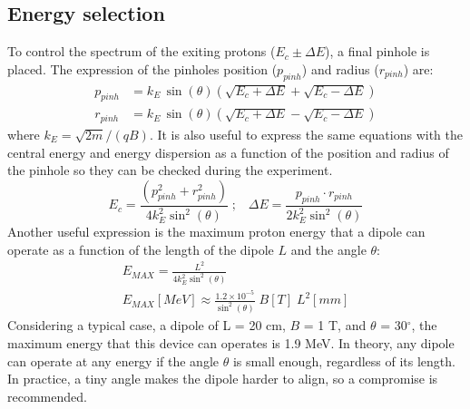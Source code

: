 \documentclass{cup-hpl}
\begin{document}
\subsection{Energy selection}
To control the spectrum of the exiting protons ($E_c \pm \Delta E$), a final pinhole is placed. The expression of the pinholes position ($p_{pinh}$)  and radius ($r_{pinh}$) are:
\begin{align}
p_{pinh} & = k_E \, \sin(\theta) \left(\sqrt{E_c + \Delta E} + \sqrt{E_c - \Delta E}\right) \\
r_{pinh} & = k_E \, \sin(\theta) \left(\sqrt{E_c + \Delta E} - \sqrt{E_c - \Delta E}\right)
\label{Eq: Pinhole coordinates}
\end{align}
where  $k_E = \sqrt{2 m}/(q B)$.
It is also useful to express the same equations with the central energy and energy dispersion as a function of the position and radius of the pinhole so they can be checked during the experiment.
\begin{equation}
E_c  = \frac{(p_{pinh}^2 + r_{pinh}^2)}{4 k_E^2 \sin^2 (\theta)} \; ; \;\;\;
\Delta E  = \frac{p_{pinh} \cdot r_{pinh}}{2 k_E^2 \sin^2 (\theta)}
\label{Eq: Pinhole coordinates reversed}
\end{equation}
Another useful expression is the maximum proton energy that a dipole can operate as a function of the length of the dipole $L$ and the angle $\theta$:
\begin{gather}
E_{MAX} = \frac{L^2}{4 k_E^2 \sin^2 (\theta)}  \\
E_{MAX}[MeV]\approx   \frac{1.2 \times 10^{-5}}{\sin^2 (\theta)} \;B[T] \; L^2[mm] 
 \label{Energy_limit}
\end{gather}
Considering a typical case, a dipole of L = 20 cm, $B$ = 1 T, and $\theta$ = 30$^\circ$, the maximum energy that this device can operates is 1.9 MeV. In theory, any dipole can operate at any energy if the angle $\theta$ is small enough, regardless of its length. In practice, a tiny angle makes the dipole harder to align, so a compromise is recommended.
\end{document}
